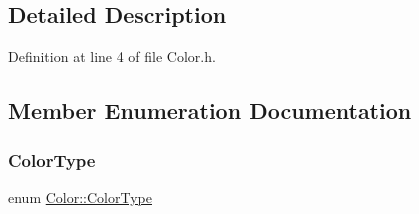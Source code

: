 \subsection{Detailed Description}


Definition at line 4 of file Color.\+h.



\subsection{Member Enumeration Documentation}
\mbox{\label{struct_color_a9216c50419c87f87e2de51ce5bd73be9}} 
\subsubsection{\texorpdfstring{Color\+Type}{ColorType}}
{\footnotesize\ttfamily enum \hyperlink{struct_color_a9216c50419c87f87e2de51ce5bd73be9}{Color\+::\+Color\+Type}}

